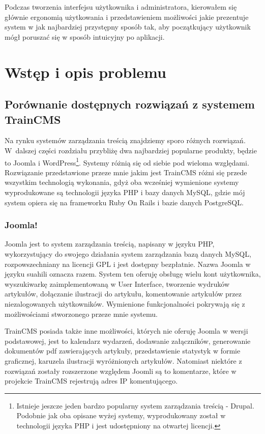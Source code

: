 \documentclass[openright]{xmgr}
\begin{document}
Podczas tworzenia interfejsu użytkownika i administratora, kierowałem się głównie ergonomią użytkowania i przedstawieniem możliwości jakie prezentuje system w jak najbardziej przystępny sposób tak, aby początkujący użytkownik mógł poruszać się w sposób intuicyjny po aplikacji.

\chapter{Wstęp i opis problemu}

\section{Porównanie dostępnych rozwiązań z systemem TrainCMS}

Na rynku systemów zarządzania treścią znajdziemy sporo różnych rozwiązań. W~dalszej części rozdziału przybliżę dwa najbardziej popularne produkty, będzie to Joomla i WordPress\footnote{Istnieje jeszcze jeden bardzo popularny system zarządzania treścią - Drupal. Podobnie jak oba opisane wyżej systemy, wyprodukowany został w technologii języka PHP i jest udostępniony na otwartej licencji.}. Systemy różnią się od siebie pod wieloma względami. Rozwiązanie przedstawione przeze mnie jakim jest TrainCMS różni się  przede wszystkim technologią wykonania, gdyż oba wcześniej wymienione systemy wyprodukowane są technologii języka PHP i bazy danych MySQL, gdzie mój system opiera się na frameworku Ruby On Rails i bazie danych PostgreSQL.

\subsection{Joomla!}

Joomla jest to system zarządzania treścią, napisany w języku PHP, wykorzystujący do swojego działania system zarządzania bazą danych MySQL, rozpowszechniany na licencji GPL i jest dostępny bezpłatnie. Nazwa Joomla w języku suahili oznacza razem.   
System ten oferuję obsługę wielu kont użytkownika, wyszukiwarkę zaimplementowaną w User Interface, tworzenie wydruków artykułów, dołączanie ilustracji do artykułu, komentowanie artykułów przez niezalogowanych użytkowników. Wymienione funkcjonalności pokrywają się z możliwościami stworzonego przeze mnie systemu. 

TrainCMS posiada także inne możliwości, których nie oferuję Joomla w wersji podstawowej, jest to kalendarz wydarzeń, dodawanie załączników, generowanie dokumentów pdf zawierających artykuły, przedstawienie statystyk w formie graficznej, karuzela ilustracji wyróżnionych artykułów. Natomiast niektóre z rozwiązań zostały rozszerzone względem Joomli są to komentarze, które w projekcie TrainCMS rejestrują adres IP komentującego. 
\end{document}
